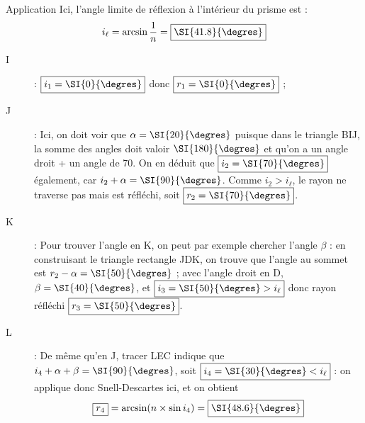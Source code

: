 \documentclass[../main/main.tex]{subfiles}
\begin{document}
\begin{NCexem}[sidebyside]{Application}
    Ici, l'angle limite de réflexion à l'intérieur du prisme est : \[i_\ell =
    \arcsin \frac{1}{n} = \boxed{\SI{41.8}{\degres}}\]
    \begin{description}
        \item[I] : $\boxed{i_1 = \SI{0}{\degres}}$ donc
            $\boxed{r_1 = \SI{0}{\degres}}$ ;
        \item[J] : Ici, on doit voir que $\alpha = \SI{20}{\degres}$ puisque
            dans le triangle BIJ, la somme des angles doit valoir $\SI{180}
            {\degres}$ et qu'on a un angle droit + un angle de \SI{70}{\degres}.
            On en déduit que $\boxed{i_2 = \SI{70}{\degres}}$ également, car
            $i_2 + \alpha = \SI{90}{\degres}$.\smallbreak
            Comme \underline{$i_2 > i_\ell$}, le rayon ne traverse pas mais est
            réfléchi, soit $\boxed{r_2 = \SI{70}{\degres}}$.
    \end{description}
    \tcblower
    \begin{description}
        \item[K] : Pour trouver l'angle en K, on peut par exemple chercher
            l'angle $\beta$ : en construisant le triangle rectangle JDK, on
            trouve que l'angle au sommet est $r_2 - \alpha = \SI{50}{\degres}$ ;
            avec l'angle droit en D, $\beta = \SI{40}{\degres}$, et $\boxed{i_3
                = \SI{50}{\degres} > i_\ell}$ donc rayon réfléchi $\boxed{r_3 =
            \SI{50}{\degres}}$.
        \item[L] : De même qu'en J, tracer LEC indique que $i_4 + \alpha + \beta
            = \SI{90}{\degres}$, soit $\boxed{i_4 = \SI{30}{\degres} < i_\ell}$
            : on applique donc Snell-Descartes ici, et on obtient
            \[\boxed{r_4} = \arcsin (n\times \sin i_4) =
            \boxed{\SI{48.6}{\degres}}\]
    \end{description}
\end{NCexem}
\end{document}
